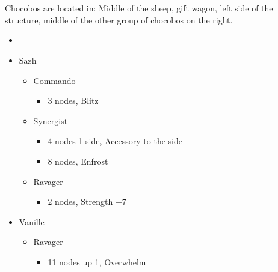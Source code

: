 \chapter[Chapter 8]{}

Chocobos are located in: Middle of the sheep, gift wagon, left side of the structure, middle of the other group of chocobos on the right. 

\begin{menu}
\begin{multicols}{2}
\begin{itemize}
    \paradigm
    \begin{itemize}
        \item {}%
{\paradigmline[1]{\textit{\com}}{\textit{\rav}}{}}%
{\paradigmline{(\com)}{(\med)}{}}%
{\paradigmline{\syn}{\sab}{}}%
{\paradigmline{\rav}{\rav}{}}%
{\paradigmline{\rav}{\sab}{}}%
{\paradigmline{\com}{\sab}{}}
    \end{itemize}
    \crystarium
    \begin{itemize}
        \item Sazh
        \begin{itemize}
            \item Commando
            \begin{itemize}
                \item 3 nodes, Blitz
            \end{itemize}
            \item Synergist
            \begin{itemize}
                \item 4 nodes 1 side, Accessory to the side
                \item 8 nodes, Enfrost
            \end{itemize}
            \item Ravager
            \begin{itemize}
                \item 2 nodes, Strength +7
            \end{itemize}
        \end{itemize}
        \item Vanille
        \begin{itemize}
            \item Ravager
            \begin{itemize}
                \item 11 nodes up 1, Overwhelm

\end{itemize}
\end{itemize}
\end{itemize}
\end{itemize}
\end{multicols}
\end{menu}
